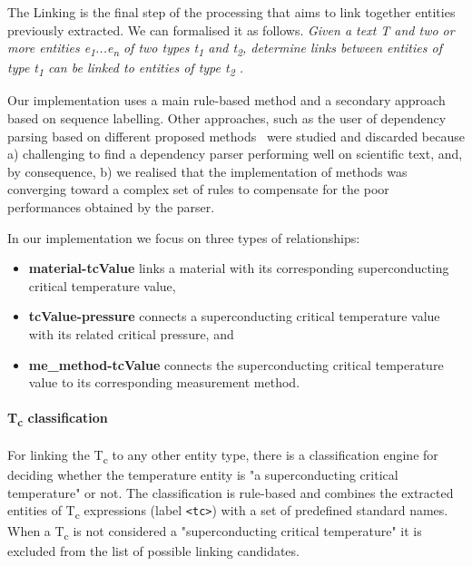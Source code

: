 \documentclass{article}
\begin{document}
The Linking is the final step of the processing that aims to link together entities previously extracted.
We can formalised it as follows. \textit{Given a text T and two or more entities e\textsubscript{1}...e\textsubscript{n} of two types t\textsubscript{1} and t\textsubscript{2}, determine links between entities of type t\textsubscript{1} can be linked to entities of type t\textsubscript{2} .} 

Our implementation uses a main rule-based method and a secondary approach based on sequence labelling. Other approaches, such as the user of dependency parsing based on different proposed methods~\cite{yoshikawa:2017acl, Tiktinsky2020pyBARTES, swayamdipta:17, zhou-zhao-2019-head} were studied and discarded because a) challenging to find a dependency parser performing well on scientific text, and, by consequence, b) we realised that the implementation of methods was converging toward a complex set of rules to compensate for the poor performances obtained by the parser.

In our implementation we focus on three types of relationships: 
\begin{itemize}
    \item \textbf{material-tcValue} links a material with its corresponding superconducting critical temperature value, 
    \item \textbf{tcValue-pressure} connects a superconducting critical temperature value with its related critical pressure, and 
    \item \textbf{me\_method-tcValue} connects the superconducting critical temperature value to its corresponding measurement method.
\end{itemize}

\paragraph{T\textsubscript{c} classification}
For linking the T\textsubscript{c} to any other entity type, there is a classification engine for deciding whether the temperature entity is  "a superconducting critical temperature" or not. 
The classification is rule-based and combines the extracted entities of T\textsubscript{c} expressions (label \texttt{<tc>}) with a set of predefined standard names. 
When a T\textsubscript{c} is not considered a "superconducting critical temperature" it is excluded from the list of possible linking candidates. 
\end{document}
